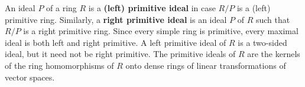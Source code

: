An ideal $P$ of a ring $R$ is a \textbf{(left) primitive ideal} in case $R/P$ is a (left) primitive ring. Similarly, a \textbf{right primitive ideal} is an ideal $P$ of $R$ such that $R/P$ is a right primitive ring. Since every simple ring is primitive, every maximal ideal is both left and right primitive. A left primitive ideal of $R$ is a two-sided ideal, but it need not be right primitive. The primitive ideals of $R$ are the kernels of the ring homomorphisms of $R$ onto dense rings of linear transformations of vector spaces.
